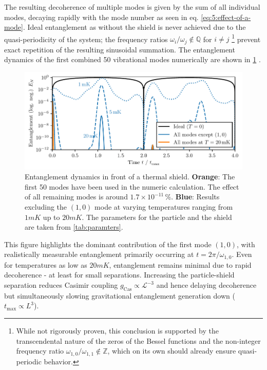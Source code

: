 The resulting decoherence of multiple modes is given by the sum of all individual modes, decaying rapidly with the mode number as seen in eq. \eqref{eq:5:effect-of-a-mode}.
Ideal entanglement as without the shield is never achieved due to the quasi-periodicity of the system; the frequency ratios $\omega_i/\omega_j \notin \mathbb{Q}$ for $i\neq j$ \footnote{While not rigorously proven, this conclusion is supported by the transcendental nature of the zeros of the Bessel functions \cite{Lorch_1995} and the non-integer frequency ratio $\omega_{1,0} / \omega_{1,1} \notin \mathbb{Z}$, which on its own should already ensure quasi-periodic behavior.} prevent exact repetition of the resulting sinusoidal summation.
The entanglement dynamics of the first combined 50 vibrational modes numerically are shown in \cref{fig:5:entanglement-multiple-modes} .
\begin{figure}[!htbp]
  \centering
  \includegraphics[width=\textwidth]{./../figures/vibrations/entanglement-multiple-modes.pdf}
  \caption{Entanglement dynamics in front of a thermal shield. \textbf{Orange}: The first 50 modes have been used in the numeric calculation. The effect of all remaining modes is around $1.7 \times 10^{-11}\,\%$. \textbf{Blue}: Results excluding the $(1,0)$ mode at varying temperatures ranging from $1\si{mK}$ up to $20\si{mK}$. The parameters for the particle and the shield are taken from \cref{tab:paramters}.}
  \label{fig:5:entanglement-multiple-modes}
\end{figure}
This figure highlights the dominant contribution of the first mode $(1,0)$, with realistically measurable entanglement primarily occurring at $t = 2 \pi/\omega_{1,0}$.
Even for temperatures as low as $20\si{mK}$, entanglement remains minimal due to rapid decoherence - at least for small separations.
Increasing the particle-shield separation reduces Casimir coupling $g_\mathrm{Cas} \propto \mathscr{L}^{-3}$ and hence delaying decoherence but simultaneously slowing gravitational entanglement generation down ($t_\mathrm{max} \propto L^3$).
